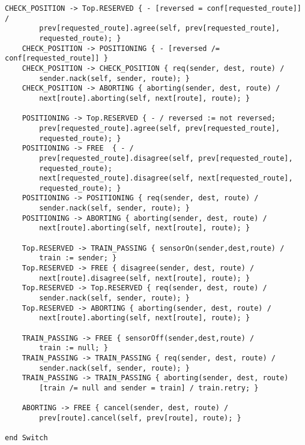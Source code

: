 \begin{lstlisting}[caption={modello della classe Switch}]
    CHECK_POSITION -> Top.RESERVED { - [reversed = conf[requested_route]] / 
    	prev[requested_route].agree(self, prev[requested_route], 
    	requested_route); }
    CHECK_POSITION -> POSITIONING { - [reversed /= conf[requested_route]] }
    CHECK_POSITION -> CHECK_POSITION { req(sender, dest, route) / 
    	sender.nack(self, sender, route); }
    CHECK_POSITION -> ABORTING { aborting(sender, dest, route) / 
    	next[route].aborting(self, next[route], route); }

    POSITIONING -> Top.RESERVED { - / reversed := not reversed; 
    	prev[requested_route].agree(self, prev[requested_route], 
    	requested_route); }
    POSITIONING -> FREE  { - / 
    	prev[requested_route].disagree(self, prev[requested_route], 
    	requested_route); 
    	next[requested_route].disagree(self, next[requested_route], 
    	requested_route); }
    POSITIONING -> POSITIONING { req(sender, dest, route) / 
    	sender.nack(self, sender, route); }
    POSITIONING -> ABORTING { aborting(sender, dest, route) / 
    	next[route].aborting(self, next[route], route); }

    Top.RESERVED -> TRAIN_PASSING { sensorOn(sender,dest,route) / 
    	train := sender; }
    Top.RESERVED -> FREE { disagree(sender, dest, route) / 
    	next[route].disagree(self, next[route], route); }
    Top.RESERVED -> Top.RESERVED { req(sender, dest, route) / 
    	sender.nack(self, sender, route); }
    Top.RESERVED -> ABORTING { aborting(sender, dest, route) / 
    	next[route].aborting(self, next[route], route); }

    TRAIN_PASSING -> FREE { sensorOff(sender,dest,route) / 
    	train := null; }
    TRAIN_PASSING -> TRAIN_PASSING { req(sender, dest, route) / 
    	sender.nack(self, sender, route); }
    TRAIN_PASSING -> TRAIN_PASSING { aborting(sender, dest, route) 
    	[train /= null and sender = train] / train.retry; }

    ABORTING -> FREE { cancel(sender, dest, route) / 
    	prev[route].cancel(self, prev[route], route); }

end Switch
\end{lstlisting}

